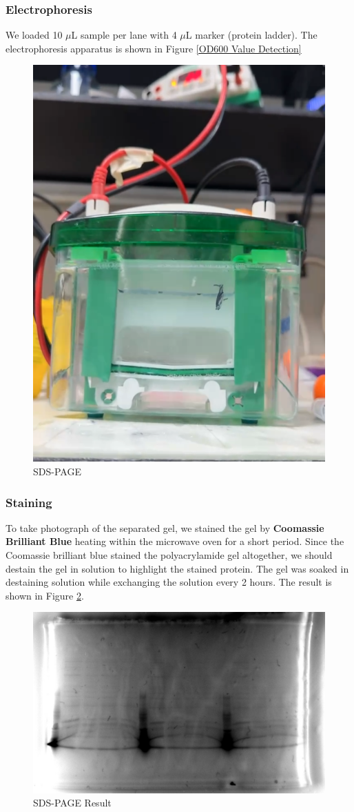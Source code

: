 \documentclass{article}
\begin{document}
\subsubsection{Electrophoresis}
We loaded 10 $\mu$L sample per lane with 4 $\mu$L marker (protein ladder).
The electrophoresis apparatus is shown in Figure \ref{OD600 Value Detection}
\begin{figure}
    \centering
    \includegraphics[width=0.5\linewidth]{../Figures/SDS-PAGE.png}
    \caption{SDS-PAGE}
    \label{SDS-PAGE}
\end{figure}
\subsubsection{Staining}
To take photograph of the separated gel, we stained the gel by \textbf{Coomassie Brilliant Blue} heating within the microwave oven for a short period.
Since the Coomassie brilliant blue stained the polyacrylamide gel altogether, we should destain the gel in solution to highlight the stained protein.
The gel was soaked in destaining solution while exchanging the solution every 2 hours.
The result is shown in Figure \ref{SDS-PAGE Result}.
\begin{figure}
    \centering
    \includegraphics[width=0.7\linewidth]{../Figures/SDS-PAGE Photograph.png}
    \caption{SDS-PAGE Result}
    \label{SDS-PAGE Result}
\end{figure}
\end{document}
